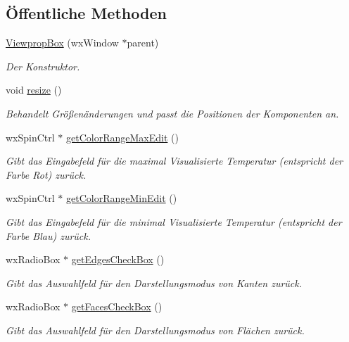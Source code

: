 \subsection*{Öffentliche Methoden}
\begin{DoxyCompactItemize}
\item 
\hyperlink{classViewpropBox_a4cac75d99079134622f57e35f1e47229}{Viewprop\-Box} (wx\-Window $\ast$parent)
\begin{DoxyCompactList}\small\item\em Der Konstruktor. \end{DoxyCompactList}\item 
void \hyperlink{classViewpropBox_a7f2732c6e7d24fc90fad55972cb1e759}{resize} ()
\begin{DoxyCompactList}\small\item\em Behandelt Größenänderungen und passt die Positionen der Komponenten an. \end{DoxyCompactList}\item 
wx\-Spin\-Ctrl $\ast$ \hyperlink{classViewpropBox_a23832121cac9cb822438072152bfa252}{get\-Color\-Range\-Max\-Edit} ()
\begin{DoxyCompactList}\small\item\em Gibt das Eingabefeld für die maximal Visualisierte Temperatur (entspricht der Farbe Rot) zurück. \end{DoxyCompactList}\item 
wx\-Spin\-Ctrl $\ast$ \hyperlink{classViewpropBox_a3f497c6cceef0c6db27adf56c53c9838}{get\-Color\-Range\-Min\-Edit} ()
\begin{DoxyCompactList}\small\item\em Gibt das Eingabefeld für die minimal Visualisierte Temperatur (entspricht der Farbe Blau) zurück. \end{DoxyCompactList}\item 
wx\-Radio\-Box $\ast$ \hyperlink{classViewpropBox_a2798ca6ed2a570bde1ac13f74dee398c}{get\-Edges\-Check\-Box} ()
\begin{DoxyCompactList}\small\item\em Gibt das Auswahlfeld für den Darstellungsmodus von Kanten zurück. \end{DoxyCompactList}\item 
wx\-Radio\-Box $\ast$ \hyperlink{classViewpropBox_a3ebd07b7d8de74d639ea80181c8c7abc}{get\-Faces\-Check\-Box} ()
\begin{DoxyCompactList}\small\item\em Gibt das Auswahlfeld für den Darstellungsmodus von Flächen zurück. \end{DoxyCompactList}\item 

\end{DoxyCompactItemize}
